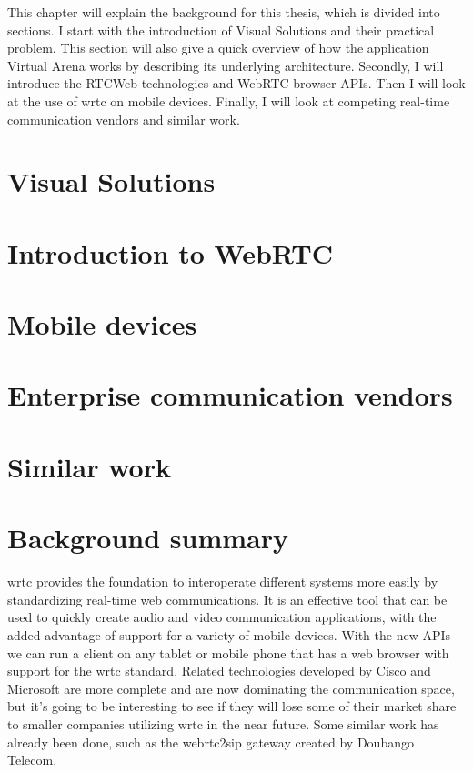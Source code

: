 
This chapter will explain the background for this thesis, which is divided into sections. I start with the introduction of Visual Solutions and their practical problem. This section will also give a quick overview of how the application Virtual Arena works by describing its underlying architecture. Secondly, I will introduce the RTCWeb technologies and WebRTC browser APIs. Then I will look at the use of \gls{wrtc} on mobile devices. Finally, I will look at competing real-time communication vendors and similar work.

\section{Visual Solutions}


\newpage
\section{Introduction to WebRTC}


\newpage
\section{Mobile devices}


\newpage
\section{Enterprise communication vendors}


\newpage
\section{Similar work}


\newpage
\section{Background summary}
\gls{wrtc} provides the foundation to interoperate different systems more easily by standardizing real-time web communications. It is an effective tool that can be used to quickly create audio and video communication applications, with the added advantage of support for a variety of mobile devices. With the new APIs we can run a client on any tablet or mobile phone that has a web browser with support for the \gls{wrtc} standard. Related technologies developed by Cisco and Microsoft are more complete and are now dominating the communication space, but it's going to be interesting to see if they will lose some of their market share to smaller companies utilizing \gls{wrtc} in the near future. Some similar work has already been done, such as the webrtc2sip gateway created by Doubango Telecom.

